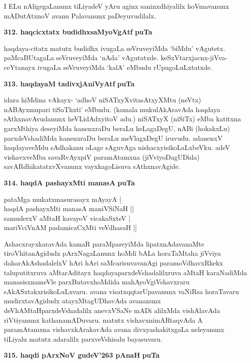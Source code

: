 {I ELu nAligegaLanunx tiLiyadeV yAru aginx saninxdhiyalilx hoVmavanunx mADutAtxnoV avanu Palavanunx paDeyuvudilalx.

\noindent
\textbf{312. haqcicxtatx budidhxsaMyoVgAtf} \hfill {\bf puTa \pageref{161}}

\smallskip
haqdaya-citatx matutx budidhx ivugaLa seVruveyiMda  `biMdu' vAgutetx. paMcaBUtagaLa seVruveyiMda `nAda' vAgutatxde. keSxVtarxjacnx-jiVva-ceYtanayx ivugaLa seVruveyiMda  `kalA' eMbudu rUpugoLuLxtatxde.

\medskip
\noindent
\textbf{313. haqdayaM tadivxjAniVyAtf} \hfill {\bf puTa \pageref{186}}

\smallskip
idara hiMdina vAkayx- `adhoV niSATxyXvitasAtxyXMtu (neVtx) nABAyxmupari tiSaThxti' eMbudu. (kamala\- mukulAkAravAda haqdaya sAthxnavAvudanunx heVLi\-dAdxyitoV adu.) niSATxyX (niSiTx) eMba katitxna garxMthi\-ya deseyiMda hanenxraDu beraLu keLa\-gaDegU, nABi (hokakxLu) parxdeVshadiMda hanenxraDu beraLu meVlagx\-DegU iruvudu. adanenxV haqdayaveMdu sAdhakanu oLage sAguvAga nishacxyisikoLaLxbeVku. adeV vishavxveMba savaRvAyxpiV paramAtamxna (jiVviyoDagUDida) savARdhikatatxvXvanunx vayxkagoLisuva sAthxnavAgide.

\medskip
\noindent
\textbf{314. haqdA pashayxMti manasA} \hfill {\bf puTa \pageref{205}}

\begin{shloka}
pataMga mukatxmasurasayx mAyayA |\\
haqdA pashayxMti manasA maniVSiNaH ||\\
samuderxV aMtaH kavayoV vicakaSxteV |\\
mariVciVnAM padamicaCxMti veVdhasaH ||
\end{shloka}


AshacxrayxkaravAda kamaR paraMpareyiMda lipatxnAdavanaMte tiroVhitanAgidudx pArxNagaLanunx hoMdi \-bALa horaTaMtaha jiVviya daharAkAshadalelxV hAri hAri saMcarisuvavanAgi paramoVdhavxRkekx talupu\-titxruva aMtarAditayx haqdayaparxdeVsha\break\-dalilxruva aMtaH karaNadiMda manasisxnameVle parxButavxhoMdida mahA\-yoVgiV\-shavxraru sAkASxtakxrisikoLuLxvaru. avana visatxqqtarUpavanunx vaNiRsa horaTavaru mudirxta\-vAgidudx atayxMta\-gUDhavAda avananunx deVhAMtaHparxdeVshadalilx anevxVSaNe mADi alilxMda vishAlavAda riVtiyanunx kathanamADuvaru. matutx vishavxnimARtaqvAda A paramAtamxna vishavxkArakavAda avana divxyashakitxgaLa nele\-yanunx tiLiyalu matutx adaralilx parxveVshisalu bayasuvaru.

\medskip
\noindent
\textbf{315. haqdi pArxNoV gudeV\char'263 pAnaH} \hfill {\bf puTa \pageref{page186}}

}
